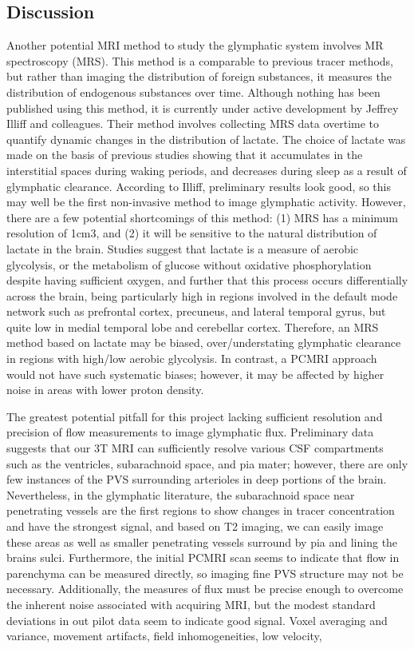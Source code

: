 \subsection*{Discussion}
Another potential MRI method to study the glymphatic system involves MR spectroscopy (MRS). This method is a comparable to previous tracer methods, but rather than imaging the distribution of foreign substances, it measures the distribution of endogenous substances over time. Although nothing has been published using this method, it is currently under active development by Jeffrey Illiff and colleagues. Their method involves collecting MRS data overtime to quantify dynamic changes in the distribution of lactate. The choice of lactate was made on the basis of previous studies showing that it accumulates in the interstitial spaces during waking periods, and decreases during sleep as a result of glymphatic clearance. According to Illiff, preliminary results look good, so this may well be the first non-invasive method to image glymphatic activity. However, there are a few potential shortcomings of this method: (1) MRS has a minimum resolution of 1cm3, and (2) it will be sensitive to the natural distribution of lactate in the brain. Studies suggest that lactate is a measure of aerobic glycolysis, or the metabolism of glucose without oxidative phosphorylation despite having sufficient oxygen, and further that this process occurs differentially across the brain, being particularly high in regions involved in the default mode network such as prefrontal cortex, precuneus, and lateral temporal gyrus, but quite low in medial temporal lobe and cerebellar cortex. Therefore, an MRS method based on lactate may be biased, over/understating glymphatic clearance in regions with high/low aerobic glycolysis. In contrast, a PCMRI approach would not have such systematic biases; however, it may be affected by higher noise in areas with lower proton density.

The greatest potential pitfall for this project lacking sufficient resolution and precision of flow measurements to image glymphatic flux. Preliminary data suggests that our 3T MRI can sufficiently resolve various CSF compartments such as the ventricles, subarachnoid space, and pia mater; however, there are only few instances of the PVS surrounding arterioles in deep portions of the brain. Nevertheless, in the glymphatic literature, the subarachnoid space near penetrating vessels are the first regions to show changes in tracer concentration and have the strongest signal, and based on T2 imaging, we can easily image these areas as well as smaller penetrating vessels surround by pia and lining the brains sulci. Furthermore, the initial PCMRI scan seems to indicate that flow in parenchyma can be measured directly, so imaging fine PVS structure may not be necessary. Additionally, the measures of flux must be precise enough to overcome the inherent noise associated with acquiring MRI, but the modest standard deviations in out pilot data seem to indicate good signal. Voxel averaging and variance, movement artifacts, field inhomogeneities, low velocity,


